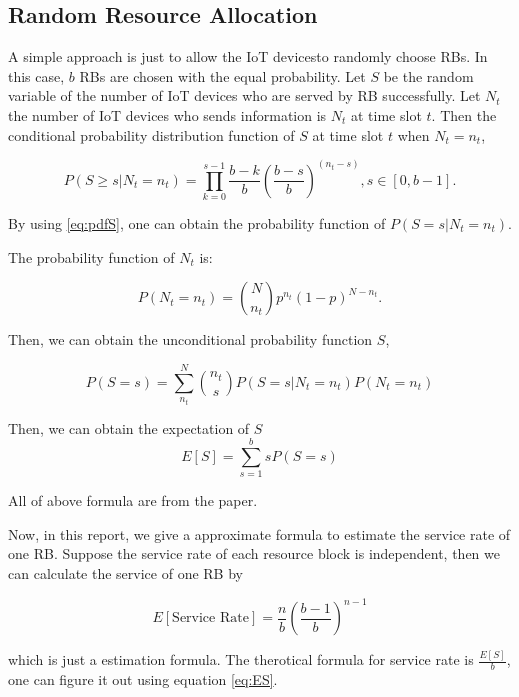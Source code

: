 \documentclass[runningheads]{llncs}
\begin{document}
\subsection{Random Resource Allocation}

A simple approach is just to allow the IoT devicesto randomly choose RBs. 
In this case, $b$ RBs are chosen with the equal probability. 
Let $S$ be the random variable of the number of IoT devices who are served by RB successfully.
Let $N_t$ the number of IoT devices who sends information is $N_t$ at time slot $t$.
Then the conditional probability distribution function of $S$ at time slot $t$ when $N_t=n_t$,

\begin{equation}
\label{eq:pdfS}
P(S\geq s|N_t=n_t)=\prod_{k=0}^{s-1}\frac{b-k}b\left(\frac{b-s}{b}\right)^{(n_t-s)}, s\in[0,b-1].
\end{equation}

By using \eqref{eq:pdfS}, one can obtain the probability function of $P(S=s|N_t=n_t)$.

The probability function of $N_t$ is:

\begin{equation}
\label{eq:pdfNt}
P(N_t=n_t)=\binom{N}{n_t}p^{n_t}(1-p)^{N-n_t}.
\end{equation}

Then, we can obtain the unconditional probability function $S$,

\begin{equation}
P(S=s)=\sum_{n_t}^N\binom{n_t}{s}P(S=s|N_t=n_t)P(N_t=n_t)
\end{equation}

Then, we can obtain the expectation of $S$
\begin{equation}
\label{eq:ES}
E[S]=\sum_{s=1}^bsP(S=s)
\end{equation}

All of above formula are from the paper\cite{ref:paper}.

Now, in this report, we give a approximate formula to estimate the service rate of one RB.
Suppose the service rate of each resource block is independent, 
then we can calculate the service of one RB by

\begin{equation}
E[\mbox{Service Rate}]=\frac nb\left(\frac{b-1}{b}\right)^{n-1}
\end{equation}

which is just a estimation formula. The therotical formula for service rate is $\frac{E[S]}{b}$, one can figure it out using equation \eqref{eq:ES}.
\end{document}

